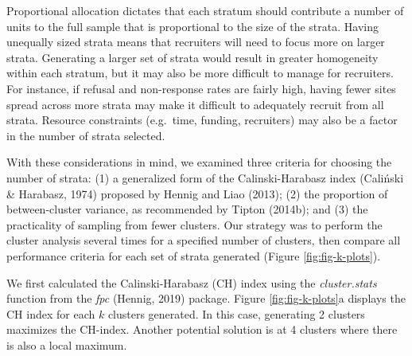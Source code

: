 \documentclass[
  man,floatsintext]{apa6}
\begin{document}
Proportional allocation dictates that each stratum should contribute a number of units to the full sample that is proportional to the size of the strata. Having unequally sized strata means that recruiters will need to focus more on larger strata. Generating a larger set of strata would result in greater homogeneity within each stratum, but it may also be more difficult to manage for recruiters. For instance, if refusal and non-response rates are fairly high, having fewer sites spread across more strata may make it difficult to adequately recruit from all strata. Resource constraints (e.g.~time, funding, recruiters) may also be a factor in the number of strata selected.

With these considerations in mind, we examined three criteria for choosing the number of strata: (1) a generalized form of the Calinski-Harabasz index (Caliński \& Harabasz, 1974) proposed by Hennig and Liao (2013); (2) the proportion of between-cluster variance, as recommended by Tipton (2014b); and (3) the practicality of sampling from fewer clusters. Our strategy was to perform the cluster analysis several times for a specified number of clusters, then compare all performance criteria for each set of strata generated (Figure \ref{fig:fig-k-plots}).

We first calculated the Calinski-Harabasz (CH) index using the \emph{cluster.stats} function from the \emph{fpc} (Hennig, 2019) package. Figure \ref{fig:fig-k-plots}a displays the CH index for each \(k\) clusters generated. In this case, generating 2 clusters maximizes the CH-index. Another potential solution is at 4 clusters where there is also a local maximum.
\end{document}
